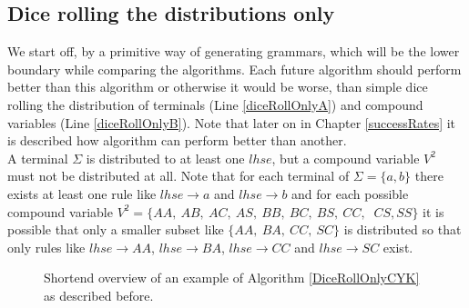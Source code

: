 \subsection{Dice rolling the distributions only} \label{diceRollOnlyCYK}
\noindent We start off, by a primitive way of generating grammars, which will be the lower boundary while comparing the algorithms. Each future algorithm should perform better than this algorithm or otherwise it would be worse, than simple dice rolling the distribution of terminals (Line \ref{diceRollOnlyA}) and compound variables (Line \ref{diceRollOnlyB}). Note that later on in Chapter \ref{successRates} it is described how algorithm can perform better than another. \\

\noindent
{}
A terminal $\Sigma$ is distributed to at least one $lhse$, but a compound variable $V^2$ must not be distributed at all. Note that for each terminal of $\Sigma=\{a,b\}$ there exists at least one rule like $lhse\rightarrow a$ and $lhse\rightarrow b$ and for each possible compound variable $V^2=\{AA,~AB,~AC,~AS,~BB,~BC,~BS,~CC,$ $~CS,SS\}$ it is possible that only a smaller subset like $\{AA,~BA,~CC,~SC\}$ is distributed so that only rules like $lhse\rightarrow AA$, $lhse\rightarrow BA$, $lhse\rightarrow CC$ and $lhse\rightarrow SC$ exist.
\noindent
\begin{figure} [h]
	\begin{minipage}{6in}
		\centering
	\end{minipage}
	\caption{Shortend overview of an example of Algorithm \ref{DiceRollOnlyCYK} as described before.}
	\label{DiceRollONlyCYKExample}
\end{figure}
\pagebreak
\clearpage
